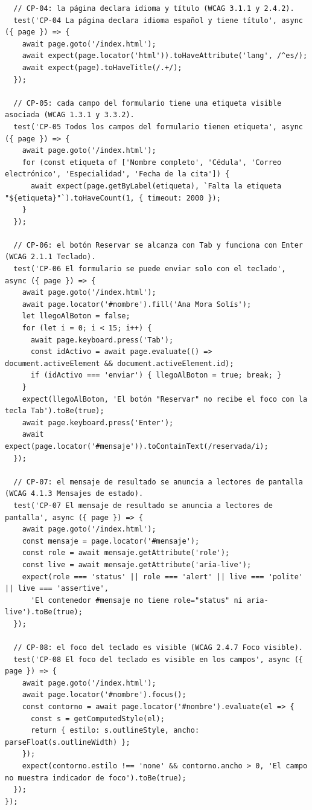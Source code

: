 \documentclass[10pt,letterpaper,onecolumn]{IEEEtran}
\begin{document}
\begin{lstlisting}
  // CP-04: la página declara idioma y título (WCAG 3.1.1 y 2.4.2).
  test('CP-04 La página declara idioma español y tiene título', async ({ page }) => {
    await page.goto('/index.html');
    await expect(page.locator('html')).toHaveAttribute('lang', /^es/);
    await expect(page).toHaveTitle(/.+/);
  });

  // CP-05: cada campo del formulario tiene una etiqueta visible asociada (WCAG 1.3.1 y 3.3.2).
  test('CP-05 Todos los campos del formulario tienen etiqueta', async ({ page }) => {
    await page.goto('/index.html');
    for (const etiqueta of ['Nombre completo', 'Cédula', 'Correo electrónico', 'Especialidad', 'Fecha de la cita']) {
      await expect(page.getByLabel(etiqueta), `Falta la etiqueta "${etiqueta}"`).toHaveCount(1, { timeout: 2000 });
    }
  });

  // CP-06: el botón Reservar se alcanza con Tab y funciona con Enter (WCAG 2.1.1 Teclado).
  test('CP-06 El formulario se puede enviar solo con el teclado', async ({ page }) => {
    await page.goto('/index.html');
    await page.locator('#nombre').fill('Ana Mora Solís');
    let llegoAlBoton = false;
    for (let i = 0; i < 15; i++) {
      await page.keyboard.press('Tab');
      const idActivo = await page.evaluate(() => document.activeElement && document.activeElement.id);
      if (idActivo === 'enviar') { llegoAlBoton = true; break; }
    }
    expect(llegoAlBoton, 'El botón "Reservar" no recibe el foco con la tecla Tab').toBe(true);
    await page.keyboard.press('Enter');
    await expect(page.locator('#mensaje')).toContainText(/reservada/i);
  });

  // CP-07: el mensaje de resultado se anuncia a lectores de pantalla (WCAG 4.1.3 Mensajes de estado).
  test('CP-07 El mensaje de resultado se anuncia a lectores de pantalla', async ({ page }) => {
    await page.goto('/index.html');
    const mensaje = page.locator('#mensaje');
    const role = await mensaje.getAttribute('role');
    const live = await mensaje.getAttribute('aria-live');
    expect(role === 'status' || role === 'alert' || live === 'polite' || live === 'assertive',
      'El contenedor #mensaje no tiene role="status" ni aria-live').toBe(true);
  });

  // CP-08: el foco del teclado es visible (WCAG 2.4.7 Foco visible).
  test('CP-08 El foco del teclado es visible en los campos', async ({ page }) => {
    await page.goto('/index.html');
    await page.locator('#nombre').focus();
    const contorno = await page.locator('#nombre').evaluate(el => {
      const s = getComputedStyle(el);
      return { estilo: s.outlineStyle, ancho: parseFloat(s.outlineWidth) };
    });
    expect(contorno.estilo !== 'none' && contorno.ancho > 0, 'El campo no muestra indicador de foco').toBe(true);
  });
});
\end{lstlisting}
\end{document}
